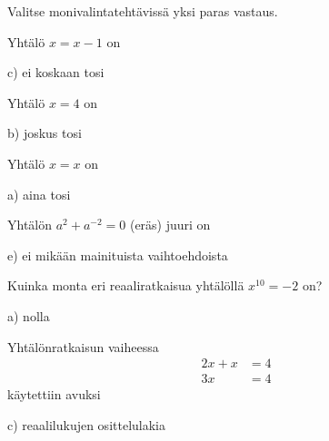 Valitse monivalintatehtävissä yksi paras vastaus.

\begin{tehtava}
Yhtälö $x = x-1$ on
\begin{vastaus}
c) ei koskaan tosi
\end{vastaus}
\end{tehtava}

\begin{tehtava}
Yhtälö $x = 4$ on
\begin{vastaus}
b) joskus tosi
\end{vastaus}
\end{tehtava}

\begin{tehtava}
Yhtälö $x = x$ on
\begin{vastaus}
a) aina tosi
\end{vastaus}
\end{tehtava}

\begin{tehtava} %
Yhtälön $a^2+a^{-2}=0$ (eräs) juuri on
	\begin{vastaus}
e) ei mikään mainituista vaihtoehdoista
	\end{vastaus}
\end{tehtava}

\begin{tehtava}
Kuinka monta eri reaaliratkaisua yhtälöllä $x^{10}=-2$ on?
	\begin{vastaus}
a) nolla
	\end{vastaus}
\end{tehtava}

\begin{tehtava}
Yhtälönratkaisun vaiheessa
\begin{align*}
2x+x&=4 \\
3x&=4
\end{align*}
käytettiin avuksi
	\begin{vastaus}
	c) reaalilukujen osittelulakia
	\end{vastaus}
\end{tehtava}

